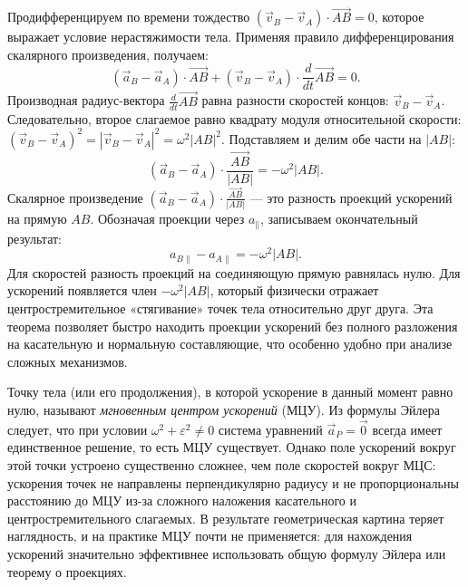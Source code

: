 \documentclass[../main.tex]{subfiles}
\begin{document}
Продифференцируем по времени тождество $(\vec{v}_B - \vec{v}_A)\cdot\overrightarrow{AB} = 0$, которое выражает условие нерастяжимости тела. Применяя правило дифференцирования скалярного произведения, получаем:
\[
(\vec{a}_B - \vec{a}_A)\cdot\overrightarrow{AB}
+
(\vec{v}_B - \vec{v}_A)\cdot\frac{d}{dt}\overrightarrow{AB}
= 0.
\]
Производная радиус-вектора $\frac{d}{dt}\overrightarrow{AB}$ равна разности скоростей концов: $\vec{v}_B - \vec{v}_A$. Следовательно, второе слагаемое равно квадрату модуля относительной скорости: $(\vec{v}_B - \vec{v}_A)^2 = |\vec{v}_B - \vec{v}_A|^2 = \omega^2|AB|^2$. Подставляем и делим обе части на $|AB|$:
\[
(\vec{a}_B - \vec{a}_A)\cdot\frac{\overrightarrow{AB}}{|AB|} = -\omega^2|AB|.
\]
Скалярное произведение $(\vec{a}_B - \vec{a}_A)\cdot\frac{\overrightarrow{AB}}{|AB|}$ --- это разность проекций ускорений на прямую $AB$. Обозначая проекции через $a_\parallel$, записываем окончательный результат:
\[
a_{B\parallel} - a_{A\parallel} = -\omega^2|AB|.
\]
Для скоростей разность проекций на соединяющую прямую равнялась нулю. Для ускорений появляется член $-\omega^2|AB|$, который физически отражает центростремительное «стягивание» точек тела относительно друг друга. Эта теорема позволяет быстро находить проекции ускорений без полного разложения на касательную и нормальную составляющие, что особенно удобно при анализе сложных механизмов.

Точку тела (или его продолжения), в которой ускорение в данный момент равно нулю, называют \textit{мгновенным центром ускорений} (МЦУ). Из формулы Эйлера следует, что при условии $\omega^2 + \varepsilon^2 \ne 0$ система уравнений $\vec{a}_P = \vec{0}$ всегда имеет единственное решение, то есть МЦУ существует. Однако поле ускорений вокруг этой точки устроено существенно сложнее, чем поле скоростей вокруг МЦС: ускорения точек не направлены перпендикулярно радиусу и не пропорциональны расстоянию до МЦУ из-за сложного наложения касательного и центростремительного слагаемых. В результате геометрическая картина теряет наглядность, и на практике МЦУ почти не применяется: для нахождения ускорений значительно эффективнее использовать общую формулу Эйлера или теорему о проекциях.
\end{document}
